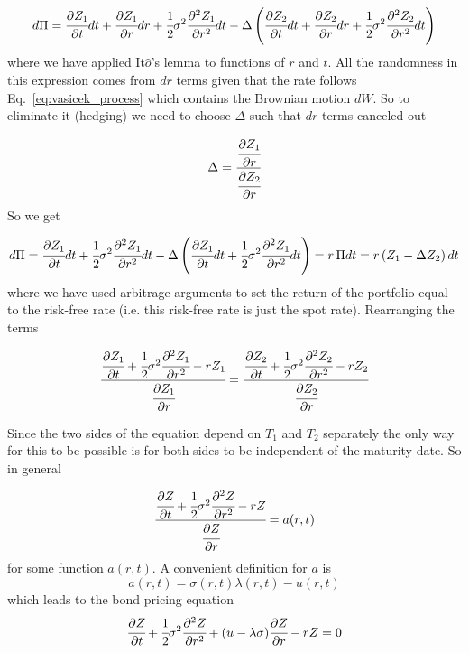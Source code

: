 \begin{equation*}
	d\Pi = \cfrac{\partial Z_1}{\partial t}dt + \cfrac{\partial Z_1}{\partial r}dr + \cfrac{1}{2}\sigma^2 \cfrac{\partial^2 Z_1}{\partial r^2}dt - \Delta\left(\cfrac{\partial Z_2}{\partial t}dt + \cfrac{\partial Z_2}{\partial r}dr + \cfrac{1}{2}\sigma^2 \cfrac{\partial^2 Z_2}{\partial r^2}dt\right)
\end{equation*}
where we have applied It\(\hat{o}\)'s lemma to functions of \(r\) and \(t\). All the randomness in this expression comes from \(dr\) terms given that the rate follows Eq.~\ref{eq:vasicek_process} which contains the Brownian motion \(dW\). So to eliminate it (hedging) we need to choose \(\Delta\) such that \(dr\) terms canceled out

\begin{equation*}
	\Delta = \cfrac{\cfrac{\partial Z_1}{\partial r}}{\cfrac{\partial Z_2}{\partial r}}
\end{equation*}
So we get

\begin{equation*}
	d\Pi = \cfrac{\partial Z_1}{\partial t}dt + \cfrac{1}{2}\sigma^2 \cfrac{\partial^2 Z_1}{\partial r^2}dt - \Delta\left(\cfrac{\partial Z_1}{\partial t}dt + \cfrac{1}{2}\sigma^2 \cfrac{\partial^2 Z_1}{\partial r^2}dt\right) = r\, \Pi dt = r \left(Z_1 - \Delta Z_2\right)dt
\end{equation*}
where we have used arbitrage arguments to set the return of the portfolio equal to the risk-free rate (i.e. this risk-free rate is just the spot rate). Rearranging the terms

\begin{equation*}
\cfrac{\cfrac{\partial Z_1}{\partial t} + \cfrac{1}{2}\sigma^2 \cfrac{\partial^2 Z_1}{\partial r^2} - rZ_1}{\cfrac{\partial Z_1}{\partial r}}=\cfrac{\cfrac{\partial Z_2}{\partial t} + \cfrac{1}{2}\sigma^2 \cfrac{\partial^2 Z_2}{\partial r^2} - rZ_2}{\cfrac{\partial Z_2}{\partial r}}
\end{equation*}

Since the two sides of the equation depend on \(T_1\) and \(T_2\) separately the only way for this to be possible is for both sides to be independent of the maturity date. So in general

\begin{equation*}
	\cfrac{\cfrac{\partial Z}{\partial t} + \cfrac{1}{2}\sigma^2 \cfrac{\partial^2 Z}{\partial r^2} - rZ}{\cfrac{\partial Z}{\partial r}}= a(r, t)
\end{equation*}
for some function $a(r, t)$. A convenient definition for $a$ is \[a(r, t) = \sigma(r, t )\lambda(r, t) − u(r, t)\] which leads to the bond pricing equation
\begin{equation}
	\cfrac{\partial Z}{\partial t} + \cfrac{1}{2}\sigma^2 \cfrac{\partial^2 Z}{\partial r^2} + (u - \lambda\sigma)\cfrac{\partial Z}{\partial r} - rZ = 0
\label{eq:bond_pricing_equation}
\end{equation}

